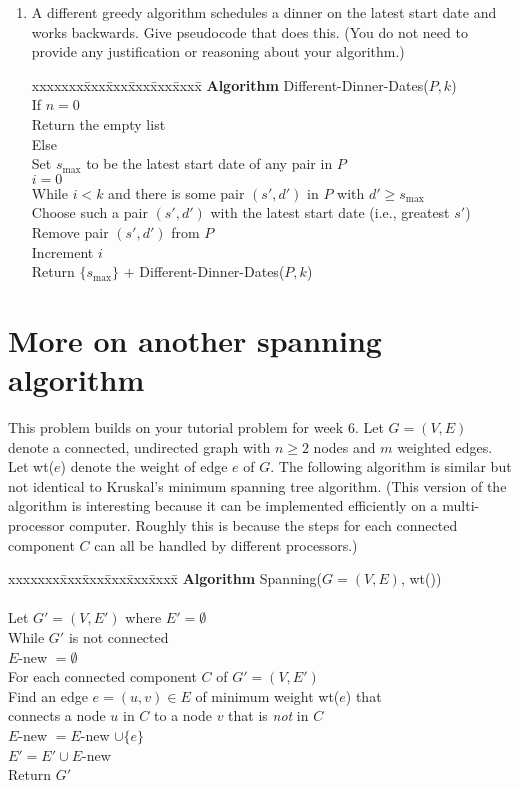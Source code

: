 \documentclass[11pt]{article}
\def\question#1{\red{#1}}
\def\soln#1{\par\blu{#1}} %
\def\blu#1{{\color{blu}#1}}
\def\red#1{{\color{red}#1}}
\begin{document}
\begin{enumerate}
\item A different greedy algorithm
schedules a dinner on the latest start date and works
backwards.  \question{Give pseudocode that does this.} (You do not need
to provide any justification or reasoning about your algorithm.)
\soln{
   \begin{tabbing}
   xxxxxxx\=xxx\=xxx\=xxx\=xxx\=xxxx\= \kill
   \> {\bf Algorithm} Different-Dinner-Dates($P, k$) \\
   \>\>   If $n = 0$ \\
   \>\>\>   Return the empty list \\
   \>\>   Else \\
   \>\>\>   Set $s_{\max}$ to be the latest start date of any pair in $P$ \\
   \>\>\>   $i=0$ \\
   \>\>\>   While $i<k$ and there is some pair $(s',d')$ in $P$ with $d' \ge s_{\max}$ \\
   \>\>\>\>    Choose such a pair $(s',d')$ with the latest start date (i.e., greatest $s'$) \\
   \>\>\>\>    Remove pair $(s',d')$ from $P$ \\
   \>\>\>\>    Increment $i$ \\
   \>\>\>   Return $\{s_{\max}\}$ $+$ Different-Dinner-Dates($P,k$) 
   \end{tabbing}
}
\end{enumerate}
\section{More on another spanning algorithm}
\label{sec-2}
This problem builds on your tutorial problem for week 6. 
Let $G = (V,E)$ denote a connected, undirected graph with $n\ge 2$
nodes and $m$ weighted edges. Let wt($e$) denote the weight of edge
$e$ of $G$. The following algorithm is similar but not identical to
Kruskal's minimum spanning tree algorithm. (This version of the
algorithm is interesting because it can be implemented efficiently
on a multi-processor computer. Roughly this is because the steps
for each connected component $C$ can all be handled by different processors.)

\begin{tabbing}
xxxxxxx\=xxx\=xxx\=xxx\=xxx\=xxxx\= \kill
\> {\bf Algorithm} Spanning($G = (V,E)$, wt()) \\
\>\>    \\
\>\> Let $G'= (V,E')$ where $E' = \emptyset$ \\
\>\> While $G'$ is not connected \\
\>\>\> $E$-new $= \emptyset$ \\
\>\>\>  For each connected component $C$ of $G' = (V, E')$ \\
\>\>\>\>   Find an edge $e =(u,v) \in E$ of minimum weight wt($e$) that \\
\>\>\>\>   connects a node $u$ in $C$ to a node $v$ that is {\em not} in $C$ \\
\>\>\>\>   $E$-new $= E$-new $\cup \{e\}$ \\
\>\>\> $E' = E' \cup E$-new \\
\>\> Return $G'$ \\
\end{tabbing}
\end{document}
